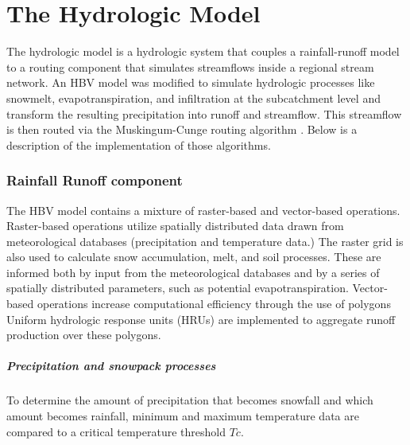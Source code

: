 \chapter{The Hydrologic Model}
\label{chap:daWUAPhydroengine}

The hydrologic model is a hydrologic system that couples a rainfall-runoff model to a routing component that simulates streamflows inside a regional stream network. An HBV model \cite{Bergstrom1992, Bergstrom1976} was modified to simulate hydrologic processes like snowmelt, evapotranspiration, and infiltration at the subcatchment level and transform the resulting precipitation into runoff and streamflow. This streamflow is then routed via the Muskingum-Cunge routing algorithm \cite{V.TChowD.RMaidment1988}. Below is a description of the implementation of those algorithms.

\subsection{Rainfall Runoff component}

The HBV model \cite{Bergstrom1992, Bergstrom1976} contains a mixture of raster-based and vector-based operations. Raster-based operations utilize spatially distributed data drawn from meteorological databases (precipitation and temperature data.)  The raster grid is also used to calculate snow accumulation, melt, and soil processes. These are informed both by input from the meteorological databases and by a series of spatially distributed parameters, such as potential evapotranspiration. Vector-based operations increase computational efficiency through the use of polygons Uniform hydrologic response units (HRUs) are implemented to aggregate runoff production over these polygons.

\paragraph{Precipitation and snowpack processes}     

To determine the amount of precipitation that becomes snowfall and which amount becomes rainfall, minimum and maximum temperature data are compared to a critical temperature threshold $Tc$.


